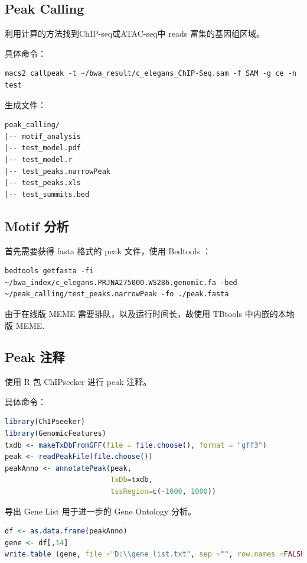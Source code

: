 \documentclass[UTF8]{ctexart}
\begin{document}
\subsection{Peak Calling}

利用计算的方法找到ChIP-seq或ATAC-seq中 reads 富集的基因组区域。

具体命令：

\begin{lstlisting}
macs2 callpeak -t ~/bwa_result/c_elegans_ChIP-Seq.sam -f SAM -g ce -n test
\end{lstlisting}

生成文件：

\begin{lstlisting}
peak_calling/
|-- motif_analysis
|-- test_model.pdf
|-- test_model.r
|-- test_peaks.narrowPeak
|-- test_peaks.xls
|-- test_summits.bed
\end{lstlisting}


\subsection{Motif 分析}

首先需要获得 fasta 格式的 peak 文件，使用 Bedtools ：

\begin{lstlisting}
bedtools getfasta -fi ~/bwa_index/c_elegans.PRJNA275000.WS286.genomic.fa -bed ~/peak_calling/test_peaks.narrowPeak -fo ./peak.fasta
\end{lstlisting}

由于在线版 MEME 需要排队，以及运行时间长，故使用 TBtools 中内嵌的本地版 MEME.

\subsection{Peak 注释}

使用 R 包 ChIPseeker 进行 peak 注释。

具体命令：

\begin{lstlisting}[language=R]
library(ChIPseeker)
library(GenomicFeatures)
txdb <- makeTxDbFromGFF(file = file.choose(), format = "gff3")
peak <- readPeakFile(file.choose())
peakAnno <- annotatePeak(peak,
                         TxDb=txdb,
                         tssRegion=c(-1000, 1000))
\end{lstlisting}

导出 Gene List 用于进一步的 Gene Ontology 分析。

\begin{lstlisting}[language=R]
df <- as.data.frame(peakAnno)
gene <- df[,14]
write.table (gene, file ="D:\\gene_list.txt", sep ="", row.names =FALSE, col.names =FALSE, quote =FALSE)
\end{lstlisting}
\end{document}
